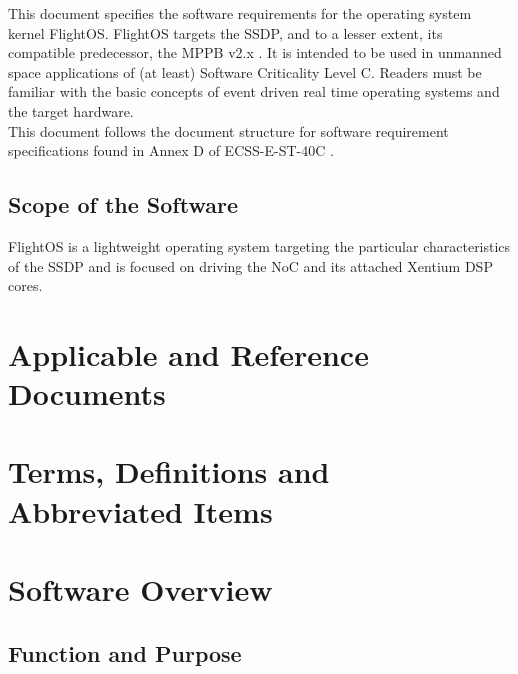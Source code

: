 This document specifies the software requirements for the operating system
kernel FlightOS. FlightOS targets the \gls{SSDP}, and to a lesser extent, its
compatible predecessor, the \gls{MPPB} v2.x \cite{MPPB}.
It is intended to be used in unmanned space applications of (at least)
Software Criticality Level C. Readers must be familiar with the basic concepts
of event driven real time operating systems and the target hardware. \\

\noindent
This document follows the document structure for software requirement
specifications found in Annex D of ECSS-E-ST-40C \cite{ECSS40C}.

\section{Scope of the Software}

FlightOS is a lightweight operating system targeting the particular
characteristics of the \gls{SSDP} and is focused on driving the \gls{NoC} and
its attached \gls{Xentium} \gls{DSP} cores.

\chapter{Applicable and Reference Documents} %

\printbibliography[heading=none]


\chapter{Terms, Definitions and Abbreviated Items}
\printglossary[type=acronym]
\printglossary[type=main, style=altlist]



\chapter{Software Overview}

\section{Function and Purpose}

